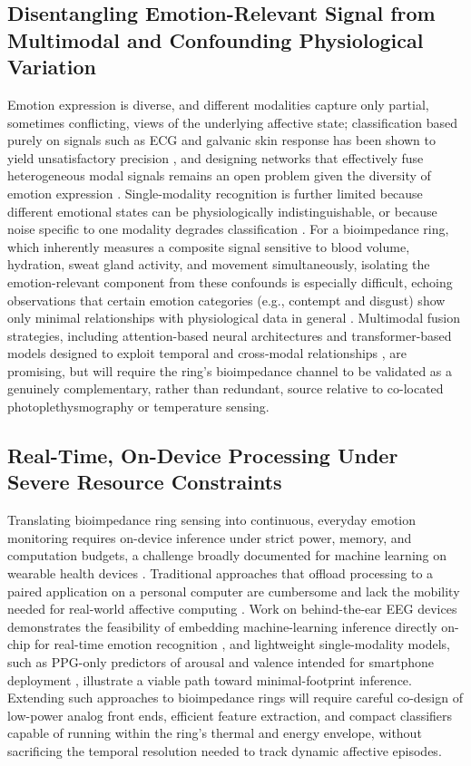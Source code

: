 \subsection{Disentangling Emotion-Relevant Signal from Multimodal and Confounding Physiological Variation}
Emotion expression is diverse, and different modalities capture only partial, sometimes conflicting, views of the underlying affective state; classification based purely on signals such as ECG and galvanic skin response has been shown to yield unsatisfactory precision \cite{dessai2024multimodal}, and designing networks that effectively fuse heterogeneous modal signals remains an open problem given the diversity of emotion expression \cite{zou2024emotion}. Single-modality recognition is further limited because different emotional states can be physiologically indistinguishable, or because noise specific to one modality degrades classification \cite{udahemuka2024multimodal}. For a bioimpedance ring, which inherently measures a composite signal sensitive to blood volume, hydration, sweat gland activity, and movement simultaneously, isolating the emotion-relevant component from these confounds is especially difficult, echoing observations that certain emotion categories (e.g., contempt and disgust) show only minimal relationships with physiological data in general \cite{onim2025exploring}. Multimodal fusion strategies, including attention-based neural architectures \cite{zou2024emotion} and transformer-based models designed to exploit temporal and cross-modal relationships \cite{li2025transformer,wu2023transformer}, are promising, but will require the ring's bioimpedance channel to be validated as a genuinely complementary, rather than redundant, source relative to co-located photoplethysmography or temperature sensing.

\subsection{Real-Time, On-Device Processing Under Severe Resource Constraints}
Translating bioimpedance ring sensing into continuous, everyday emotion monitoring requires on-device inference under strict power, memory, and computation budgets, a challenge broadly documented for machine learning on wearable health devices \cite{sabry2022machine}. Traditional approaches that offload processing to a paired application on a personal computer are cumbersome and lack the mobility needed for real-world affective computing \cite{mai2023real}. Work on behind-the-ear EEG devices demonstrates the feasibility of embedding machine-learning inference directly on-chip for real-time emotion recognition \cite{mai2023real}, and lightweight single-modality models, such as PPG-only predictors of arousal and valence intended for smartphone deployment \cite{darabkh2026exploring}, illustrate a viable path toward minimal-footprint inference. Extending such approaches to bioimpedance rings will require careful co-design of low-power analog front ends, efficient feature extraction, and compact classifiers capable of running within the ring's thermal and energy envelope, without sacrificing the temporal resolution needed to track dynamic affective episodes.

